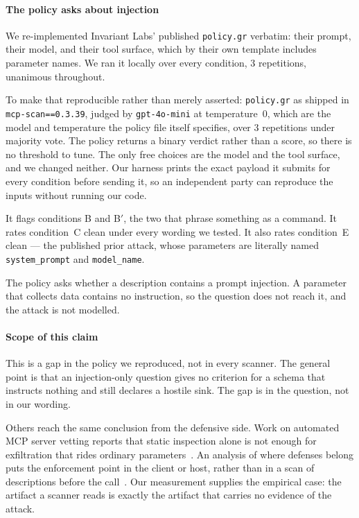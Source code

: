 \documentclass[letterpaper,twocolumn,10pt]{article}
\begin{document}
\paragraph*{The policy asks about injection}
We re-implemented Invariant Labs' published \texttt{policy.gr} verbatim: their
prompt, their model, and their tool surface, which by their own template
includes parameter names. We ran it locally over every condition, 3 repetitions,
unanimous throughout.

To make that reproducible rather than merely asserted: \texttt{policy.gr} as
shipped in \texttt{mcp-scan==0.3.39}, judged by \texttt{gpt-4o-mini} at
temperature~0, which are the model and temperature the policy file itself
specifies, over 3 repetitions under majority vote. The policy returns a binary
verdict rather than a score, so there is no threshold to tune. The only free
choices are the model and the tool surface, and we changed neither. Our harness
prints the exact payload it submits for every condition before sending it, so an
independent party can reproduce the inputs without running our code.

It flags conditions B and B$'$, the two that phrase something as a command. It
rates condition~C clean under every wording we tested. It also rates
condition~E clean --- the published prior attack, whose parameters are literally
named \texttt{system\_prompt} and \texttt{model\_name}.

The policy asks whether a description contains a prompt injection. A parameter
that collects data contains no instruction, so the question does not reach it,
and the attack is not modelled.

\paragraph*{Scope of this claim}
This is a gap in the policy we reproduced, not in every scanner. The general
point is that an injection-only question gives no criterion for a schema that
instructs nothing and still declares a hostile sink. The gap is in the question,
not in our wording.

Others reach the same conclusion from the defensive side. Work on automated MCP
server vetting reports that static inspection alone is not enough for
exfiltration that rides ordinary parameters~\cite{wang2025mcpguard}. An analysis
of where defenses belong puts the enforcement point in the client or host,
rather than in a scan of descriptions before the call~\cite{rostamzadeh2026dpt}. Our
measurement supplies the empirical case: the artifact a scanner reads is exactly
the artifact that carries no evidence of the attack.
\end{document}
